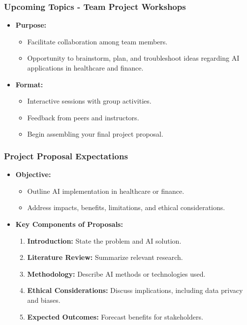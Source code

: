 \documentclass[aspectratio=169]{beamer}
\begin{document}
\begin{frame}[fragile]
    \frametitle{Upcoming Topics - Team Project Workshops}
    \begin{itemize}
        \item \textbf{Purpose:} 
        \begin{itemize}
            \item Facilitate collaboration among team members.
            \item Opportunity to brainstorm, plan, and troubleshoot ideas regarding AI applications in healthcare and finance.
        \end{itemize}
        \item \textbf{Format:} 
        \begin{itemize}
            \item Interactive sessions with group activities.
            \item Feedback from peers and instructors.
            \item Begin assembling your final project proposal.
        \end{itemize}
    \end{itemize}
\end{frame}

\begin{frame}[fragile]
    \frametitle{Project Proposal Expectations}
    \begin{itemize}
        \item \textbf{Objective:}
        \begin{itemize}
            \item Outline AI implementation in healthcare or finance.
            \item Address impacts, benefits, limitations, and ethical considerations.
        \end{itemize}
        \item \textbf{Key Components of Proposals:}
        \begin{enumerate}
            \item \textbf{Introduction:} State the problem and AI solution.
            \item \textbf{Literature Review:} Summarize relevant research.
            \item \textbf{Methodology:} Describe AI methods or technologies used.
            \item \textbf{Ethical Considerations:} Discuss implications, including data privacy and biases.
            \item \textbf{Expected Outcomes:} Forecast benefits for stakeholders.
        \end{enumerate}
    \end{itemize}
\end{frame}
\end{document}
